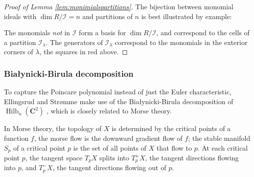 \documentclass{amsart}[12pt]
\theoremstyle{definition}
\newcommand{\C}{\mathbf{C}}
\DeclareMathOperator{\Hilb}{Hilb}
\begin{document}
\begin{proof}[Proof of Lemma \ref{lem:monimialspartitions}]

The bijection between monomial ideals with $\dim R/\mathcal{I}=n$ and partitions of $n$ is best illustrated by example: 

\begin{center}
\end{center}

The monomials \emph{not} in $\mathcal{I}$ form a basis for $\dim R/\mathcal{I}$, and correspond to the cells of a partition $\mathcal{I}_\lambda$.  The generators of $\mathcal{I}_\lambda$ correspond to the monomials in the exterior corners of $\lambda$, the squares in red above.

\end{proof}












\subsubsection{Bia\l ynicki-Birula decomposition}

To capture the Poincare polynomial instead of just the Euler characteristic, Ellingsrud and Str\o mme make use of the Bia\l ynicki-Birula decomposition of $\Hilb_n(\C^2)$ \cite{BB}, which is closely related to Morse theory. 

In Morse theory, the topology of $X$ is determined by the critical points of a function $f$, the morse flow is the downward gradient flow of $f$; the stable manifold $S_p$ of a critical point $p$ is the set of all points of $X$ that flow to $p$.  At each critical point $p$, the tangent space $T_pX$ splits into $T^+_pX$, the tangent directions flowing into $p$, and $T_p^-X$, the tangent directions flowing out of $p$.
\end{document}
